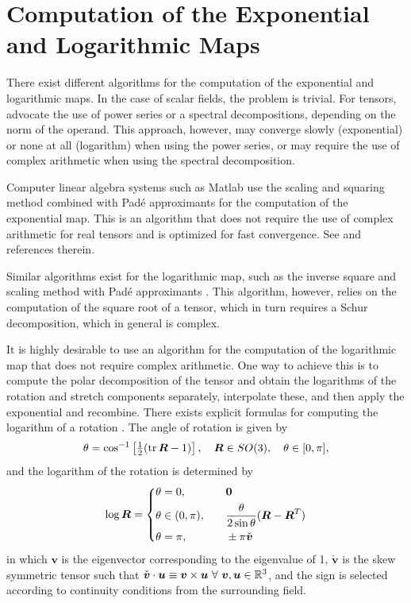 \documentclass[12pt]{article}
\newcommand{\mbs}[1]{\boldsymbol{#1}}
\newcommand{\mbb}[1]{\mathbb{#1}}
\def\bv{{\mbs{v}}} \def\bw{{\mbs{w}}} \def\bx{{\mbs{x}}}
\DeclareMathOperator{\tr}{tr}
\begin{document}
\section{Computation of the Exponential and Logarithmic Maps}
\label{sec:explogmaps}

There exist different algorithms for the computation of the
exponential and logarithmic maps. In the case of scalar fields, the
problem is trivial. For tensors, \citet*{Ortiz.etal:2001} advocate the
use of power series or a spectral decompositions, depending on the
norm of the operand. This approach, however, may converge slowly
(exponential) or none at all (logarithm) when using the power series,
or may require the use of complex arithmetic when using the spectral
decomposition.

Computer linear algebra systems such as Matlab use the scaling and
squaring method combined with Pad\'{e} approximants for the
computation of the exponential map. This is an algorithm that does not
require the use of complex arithmetic for real tensors and is
optimized for fast convergence. See \citep{Higham:2005} and
references therein.

Similar algorithms exist for the logarithmic map, such as the inverse
square and scaling method with Pad\'{e} approximants
\citep{Higham:2001}. This algorithm, however, relies on the
computation of the square root of a tensor, which in turn requires a
Schur decomposition, which in general is complex.

It is highly desirable to use an algorithm for the computation of the
logarithmic map that does not require complex arithmetic. One way to
achieve this is to compute the polar decomposition of the tensor and
obtain the logarithms of the rotation and stretch components
separately, interpolate these, and then apply the exponential and
recombine. There exists explicit formulas for computing the logarithm
of a rotation \citep{Park.Ravani:1997}. The angle of rotation is
given by
\begin{equation}
  \theta = \cos^{-1} \left[  \tfrac{1}{2} (\tr \bR - 1) \right],
  \quad
  \bR \in SO(3),
  \quad
  \theta \in [0, \pi],
\end{equation}
and the logarithm of the rotation is determined by
\begin{align}
  \log \bR =
  \left\{ 
    \begin{aligned}
      & \theta = 0, & \quad & \mathbf{0}
      \\
      & \theta \in (0, \pi), & \quad &
      \frac{\theta}{2 \sin \theta} (\bR - \bR^T)
      \\
      & \theta = \pi, & \quad & \pm \pi \check{\bv}
    \end{aligned}
  \right. \label{eq:log-rotation}
\end{align}
in which $\bv$ is the eigenvector corresponding to the eigenvalue of
1, $\check{\bv}$ is the skew symmetric tensor such that $\check{\bv}
\cdot \bu \equiv \bv \times \bu \ \forall \ \bv, \bu \in \mbb{R}^3$,
and the sign is selected according to continuity conditions from the
surrounding field.
\end{document}
